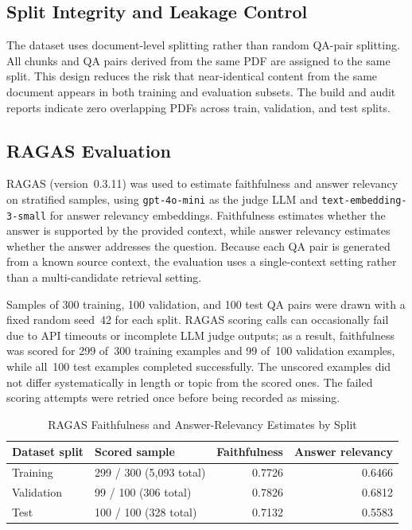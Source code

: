 \documentclass[conference]{IEEEtran}
\begin{document}
\subsection{Split Integrity and Leakage Control}
The dataset uses document-level splitting rather than random QA-pair splitting. All chunks and QA pairs derived from the same PDF are assigned to the same split. This design reduces the risk that near-identical content from the same document appears in both training and evaluation subsets. The build and audit reports indicate zero overlapping PDFs across train, validation, and test splits.

\subsection{RAGAS Evaluation}
RAGAS (version~0.3.11) was used to estimate faithfulness and answer relevancy on stratified samples, using \texttt{gpt-4o-mini} as the judge LLM and \texttt{text-embedding-3-small} for answer relevancy embeddings. Faithfulness estimates whether the answer is supported by the provided context, while answer relevancy estimates whether the answer addresses the question. Because each QA pair is generated from a known source context, the evaluation uses a single-context setting rather than a multi-candidate retrieval setting.

Samples of 300 training, 100 validation, and 100 test QA pairs were drawn with a fixed random seed~42 for each split. RAGAS scoring calls can occasionally fail due to API timeouts or incomplete LLM judge outputs; as a result, faithfulness was scored for 299 of~300 training examples and 99 of~100 validation examples, while all~100 test examples completed successfully. The unscored examples did not differ systematically in length or topic from the scored ones. The failed scoring attempts were retried once before being recorded as missing.

\begin{table}[t]
\caption{RAGAS Faithfulness and Answer-Relevancy Estimates by Split}
\label{tab:ragas}
\centering
\scriptsize
\setlength{\tabcolsep}{2pt}
\begin{tabular}{|p{}|p{}|r|r|}
\hline
\textbf{Dataset split} & \textbf{Scored sample} & \textbf{Faithfulness} & \textbf{Answer relevancy} \\
\hline
Training & 299 / 300 (5,093 total) & 0.7726 & 0.6466 \\
Validation & 99 / 100 (306 total) & 0.7826 & 0.6812 \\
Test & 100 / 100 (328 total) & 0.7132 & 0.5583 \\
\hline
\end{tabular}
\end{table}
\end{document}
